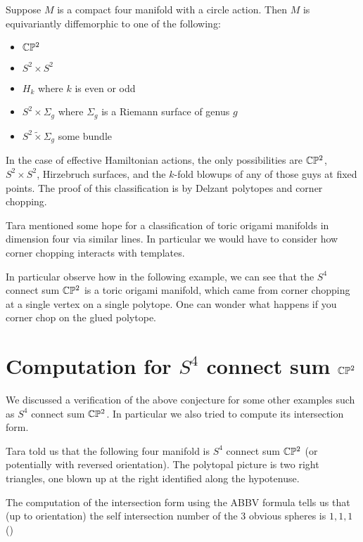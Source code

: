 \documentclass[12pt]{article}
\begin{document}
\begin{theorem}
    Suppose $M$ is a compact four manifold with a circle action. Then $M$ is equivariantly 
    diffemorphic to one of the following: \begin{itemize}
        \item $\mathbb{C}\mathbb{P}^2$
        \item $S^2\times S^2$
        \item $H_k$ where $k$ is even or odd
        \item $S^2\times \Sigma_g$ where $\Sigma_g$ is a Riemann surface of genus $g$
        \item $S^2 \tilde \times\Sigma_g$ some bundle
    \end{itemize}
    In the case of effective Hamiltonian actions, the only possibilities are $\mathbb{C}\mathbb{P}^2$, $S^2\times S^2$, Hirzebruch surfaces,
    and the $k$-fold blowups of any of those guys at fixed points. The proof of this classification is by Delzant polytopes and
    corner chopping. 
\end{theorem}
Tara mentioned some hope for a classification of toric origami manifolds in dimension four via similar lines. 
In particular we would have to consider how corner chopping interacts with templates.

\hfill

In particular observe how in the following example, we can see that the $S^4$ connect sum $\mathbb{C}\mathbb{P}^2$ is a toric origami manifold, 
which came from corner chopping at a single vertex on a single polytope. One can wonder what happens if you corner chop on the glued polytope.


\section{Computation for $S^4$ connect sum $\mathbb{C}\mathbb{P}^2$} 
We discussed a verification of the above conjecture for some other examples such as $S^4$ connect sum $\mathbb{C}\mathbb{P}^2$.
In particular we also tried to compute its intersection form. 
\begin{example}
    Tara told us that the following four manifold is $S^4$ connect sum $\mathbb{C}\mathbb{P}^2$ (or potentially with reversed orientation). 
    The polytopal picture is two right triangles, one blown up at the right identified along the hypotenuse.

    \hfill

    The computation of the intersection form using the ABBV formula tells us that (up to orientation) the self intersection number of the 3 obvious spheres is $1,1,1$ 
    ()   
\end{example}
\end{document}
